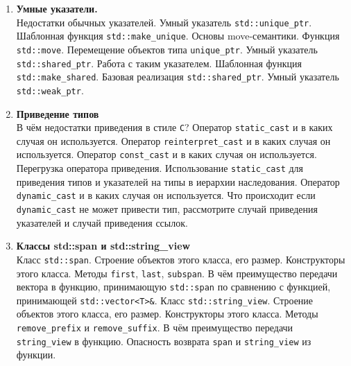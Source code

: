 \documentclass{article}
\begin{document}
\begin{enumerate}
\item \textbf{Умные указатели.}\\
Недостатки обычных указателей. Умный указатель \texttt{std::unique\_ptr}. Шаблонная функция \texttt{std::make\_unique}. Основы move-семантики. Функция \texttt{std::move}. Перемещение объектов типа \texttt{unique\_ptr}. Умный указатель \texttt{std::shared\_ptr}. Работа с таким указателем. Шаблонная функция \texttt{std::make\_shared}. Базовая реализация \texttt{std::shared\_ptr}. Умный указатель \texttt{std::weak\_ptr}.

\item \textbf{Приведение типов}\\
В чём недостатки приведения в стиле \texttt{C}? Оператор \texttt{static\_cast} и в каких случая он используется. Оператор \texttt{reinterpret\_cast} и в каких случая он используется. Оператор \texttt{const\_cast} и в каких случая он используется. Перегрузка оператора приведения. Использование \texttt{static\_cast} для приведения типов и указателей на типы в иерархии наследования. Оператор \texttt{dynamic\_cast} и в каких случая он используется. Что происходит если \texttt{dynamic\_cast} не может привести тип, рассмотрите случай приведения указателей и случай приведения ссылок.

\item \textbf{Классы std::span и std::string\_view}\\
Класс \texttt{std::span}. Строение объектов этого класса, его размер. Конструкторы этого класса. Методы \texttt{first}, \texttt{last}, \texttt{subspan}. В чём преимущество передачи вектора в функцию, принимающую \texttt{std::span} по сравнению с функцией, принимающей \texttt{std::vector<T>\&}. Класс \texttt{std::string\_view}. Строение объектов этого класса, его размер. Конструкторы этого класса. Методы \texttt{remove\_prefix} и \texttt{remove\_suffix}. В чём преимущество передачи \texttt{string\_view} в функцию. Опасность возврата \texttt{span} и \texttt{string\_view} из функции.

\end{enumerate}
\end{document}
